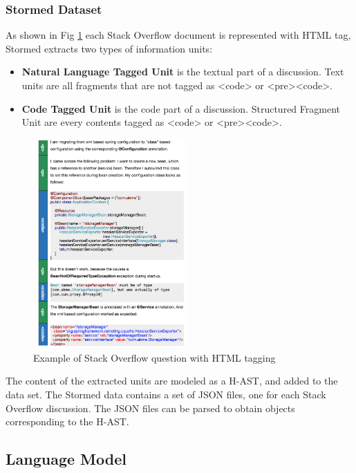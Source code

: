 \documentclass[12pt,mscthesis]{usiinfthesis}
\begin{document}
	 \subsubsection{Stormed Dataset}

	  As shown in Fig \ref{stackOverflow} each Stack Overflow document is represented with HTML tag, Stormed extracts two types of information units:
	 	 \begin{itemize}
		\item \textbf{Natural Language Tagged Unit} is the textual part of a discussion. Text units are all fragments that are not tagged as <code> or <pre><code>.	
		\item \textbf{Code Tagged Unit} is the code part of a discussion. Structured Fragment Unit are every contents tagged as <code> or <pre><code>.
	 \end{itemize}


	\begin{figure}[htbp]
	 \centering
	\includegraphics[width=6cm,height=8cm]{stackOverflow}
	\caption{Example of Stack Overflow question with HTML tagging}
	\label{stackOverflow}
	\end{figure}


	The content of the extracted units are modeled as a H-AST, and added to the data set. The Stormed data contains a set of JSON files, one for each Stack Overflow discussion. The JSON files can be parsed to obtain objects corresponding to the H-AST.

	\subsection{Language Model}
\end{document}
